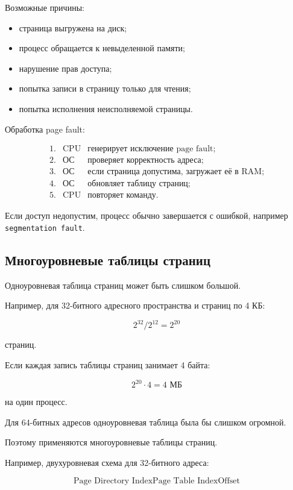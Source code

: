 \documentclass[12pt,a4paper]{article}
\theoremstyle{remark}
\begin{document}
Возможные причины:
\begin{itemize}
    \item страница выгружена на диск;
    \item процесс обращается к невыделенной памяти;
    \item нарушение прав доступа;
    \item попытка записи в страницу только для чтения;
    \item попытка исполнения неисполняемой страницы.
\end{itemize}

Обработка page fault:

\[
\begin{array}{rcl}
1. & \text{CPU} & \text{генерирует исключение page fault;} \\
2. & \text{ОС} & \text{проверяет корректность адреса;} \\
3. & \text{ОС} & \text{если страница допустима, загружает её в RAM;} \\
4. & \text{ОС} & \text{обновляет таблицу страниц;} \\
5. & \text{CPU} & \text{повторяет команду.}
\end{array}
\]

Если доступ недопустим, процесс обычно завершается с ошибкой, например \texttt{segmentation fault}.

\subsection{Многоуровневые таблицы страниц}

Одноуровневая таблица страниц может быть слишком большой.

Например, для 32-битного адресного пространства и страниц по 4 КБ:

\[
2^{32} / 2^{12} = 2^{20}
\]

страниц.

Если каждая запись таблицы страниц занимает 4 байта:

\[
2^{20} \cdot 4 = 4 \text{ МБ}
\]

на один процесс.

Для 64-битных адресов одноуровневая таблица была бы слишком огромной.

Поэтому применяются многоуровневые таблицы страниц.

Например, двухуровневая схема для 32-битного адреса:

\[
\boxed{\text{Page Directory Index}}
\boxed{\text{Page Table Index}}
\boxed{\text{Offset}}
\]
\end{document}
